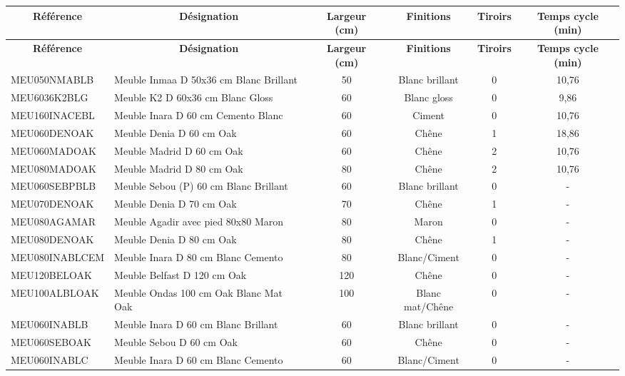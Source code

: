 \documentclass[12pt,a4paper]{article}
\begin{document}
\begin{longtable}{|p{4cm}|p{5cm}|c|c|c|c|}
\hline
\multicolumn{1}{|c|}{\textbf{Référence}} & \multicolumn{1}{c|}{\textbf{Désignation}} & \multicolumn{1}{c|}{\textbf{Largeur (cm)}} & \multicolumn{1}{c|}{\textbf{Finitions}} & \multicolumn{1}{c|}{\textbf{Tiroirs}} & \multicolumn{1}{c|}{\textbf{Temps cycle (min)}} \\
\hline
\endfirsthead
\hline
\multicolumn{1}{|c|}{\textbf{Référence}} & \multicolumn{1}{c|}{\textbf{Désignation}} & \multicolumn{1}{c|}{\textbf{Largeur (cm)}} & \multicolumn{1}{c|}{\textbf{Finitions}} & \multicolumn{1}{c|}{\textbf{Tiroirs}} & \multicolumn{1}{c|}{\textbf{Temps cycle (min)}} \\
\hline
\endhead
\hline
\endfoot
MEU050NMABLB & Meuble Inmaa D 50x36 cm Blanc Brillant & 50 & Blanc brillant & 0 & 10,76 \\
MEU6036K2BLG & Meuble K2 D 60x36 cm Blanc Gloss & 60 & Blanc gloss & 0 & 9,86 \\
MEU160INACEBL & Meuble Inara D 60 cm Cemento Blanc & 60 & Ciment & 0 & 10,76 \\
MEU060DENOAK & Meuble Denia D 60 cm Oak & 60 & Chêne & 1 & 18,86 \\
MEU060MADOAK & Meuble Madrid D 60 cm Oak & 60 & Chêne & 2 & 10,76 \\
MEU080MADOAK & Meuble Madrid D 80 cm Oak & 80 & Chêne & 2 & 10,76 \\
MEU060SEBPBLB & Meuble Sebou (P) 60 cm Blanc Brillant & 60 & Blanc brillant & 0 & - \\
MEU070DENOAK & Meuble Denia D 70 cm Oak & 70 & Chêne & 1 & - \\
MEU080AGAMAR & Meuble Agadir avec pied 80x80 Maron & 80 & Maron & 0 & - \\
MEU080DENOAK & Meuble Denia D 80 cm Oak & 80 & Chêne & 1 & - \\
MEU080INABLCEM & Meuble Inara D 80 cm Blanc Cemento & 80 & Blanc/Ciment & 0 & - \\
MEU120BELOAK & Meuble Belfast D 120 cm Oak & 120 & Chêne & 0 & - \\
MEU100ALBLOAK & Meuble Ondas 100 cm Oak Blanc Mat Oak & 100 & Blanc mat/Chêne & 0 & - \\
MEU060INABLB & Meuble Inara D 60 cm Blanc Brillant & 60 & Blanc brillant & 0 & - \\
MEU060SEBOAK & Meuble Sebou D 60 cm Oak & 60 & Chêne & 0 & - \\
MEU060INABLC & Meuble Inara D 60 cm Blanc Cemento & 60 & Blanc/Ciment & 0 & - \\

\end{longtable}
\end{document}
